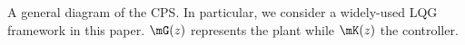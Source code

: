{A general diagram of the CPS. In particular, we consider a widely-used LQG framework in this paper. $\mG(z)$ represents the plant while $\mK(z)$ the controller.}
  \label{fig:feedback} 